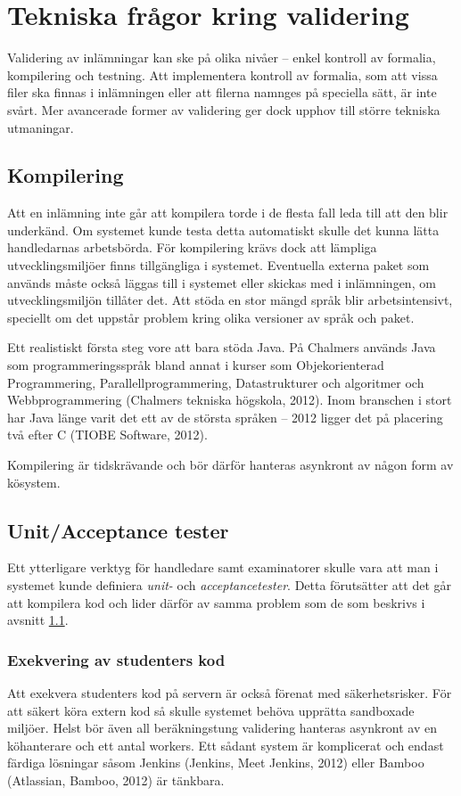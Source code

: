 \section{Tekniska frågor kring validering}

Validering av inlämningar kan ske på olika nivåer – enkel kontroll av formalia, kompilering och testning. 
Att implementera kontroll av formalia, som att vissa filer ska finnas i inlämningen eller att filerna namnges på speciella sätt, är inte svårt. Mer avancerade former av validering ger dock upphov till större tekniska utmaningar.

\subsection{Kompilering}
\label{section:kompilering}

Att en inlämning inte går att kompilera torde i de flesta fall leda till att den blir underkänd. Om systemet kunde testa detta automatiskt skulle det kunna lätta handledarnas arbetsbörda.
För kompilering krävs dock att lämpliga utvecklingsmiljöer finns tillgängliga i systemet. Eventuella externa paket som används måste också läggas till i systemet eller skickas med i inlämningen, om utvecklingsmiljön tillåter det.
Att stöda en stor mängd språk blir arbetsintensivt, speciellt om det uppstår problem kring olika versioner av språk och paket.

Ett realistiskt första steg vore att bara stöda Java. På Chalmers används Java som programmeringsspråk bland annat i kurser som Objekorienterad Programmering, Parallellprogrammering, Datastrukturer och algoritmer och Webbprogrammering (Chalmers tekniska högskola, 2012). Inom branschen i stort har Java länge varit det ett av de största språken – 2012 ligger det på placering två efter C (TIOBE Software, 2012).

Kompilering är tidskrävande och bör därför hanteras asynkront av någon form av kösystem.

\subsection{Unit/Acceptance tester}
Ett ytterligare verktyg för handledare samt examinatorer skulle vara att man i systemet kunde definiera \emph{unit-} och \emph{ acceptancetester}. Detta förutsätter att det går att kompilera kod och lider därför av samma problem som de som beskrivs i avsnitt \ref{section:kompilering}.
\subsubsection{Exekvering av studenters kod}
Att exekvera studenters kod på servern är också förenat med säkerhetsrisker.
För att säkert köra extern kod så skulle systemet behöva upprätta sandboxade miljöer. Helst bör även all beräkningstung validering hanteras asynkront av en köhanterare och ett antal workers. Ett sådant system är komplicerat och endast färdiga lösningar såsom Jenkins (Jenkins, Meet Jenkins, 2012) eller Bamboo (Atlassian, Bamboo, 2012) är tänkbara.

